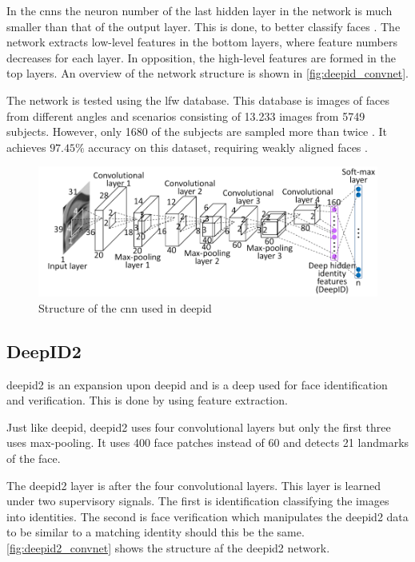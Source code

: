 In the \gls{cnn}s the neuron number of the last hidden layer in the network is much smaller than that of the output layer. This is done, to better classify faces \citep{deepID2014}. The network extracts low-level features in the bottom layers, where feature numbers decreases for each layer. In opposition, the high-level features are formed in the top layers. An overview of the network structure is shown in \autoref{fig:deepid_convnet}.

The network is tested using the \gls{lfw} database. This database is images of faces from different angles and scenarios consisting of 13.233 images from 5749 subjects. However, only 1680 of the subjects are sampled more than twice \citep{lfw2007}. It achieves $97.45\%$ accuracy on this dataset, requiring weakly aligned faces \citep{deepID2014}.

\begin{figure}[h]
	\centering
	\includegraphics[width=\textwidth]{figures/deepid_convnet}
	\caption{Structure of the \gls{cnn} used in \gls{deepid} \citep{deepID2014}}
	\label{fig:deepid_convnet}
\end{figure}

\subsection{DeepID2}
\gls{deepid2} is an expansion upon \gls{deepid} and is a deep  used for face identification and verification. This is done by using feature extraction.

Just like \gls{deepid}, \gls{deepid2} uses four convolutional layers but only the first three uses max-pooling. It uses 400 face patches instead of 60 \citep{deepID2014,sun2014} and detects 21 landmarks of the face.

The \gls{deepid2} layer is after the four convolutional layers. This layer is learned under two supervisory signals. The first is identification classifying the images into identities. The second is face verification which manipulates the \gls{deepid2} data to be similar to a matching identity should this be the same. \autoref{fig:deepid2_convnet} shows the structure af the \gls{deepid2} network.

